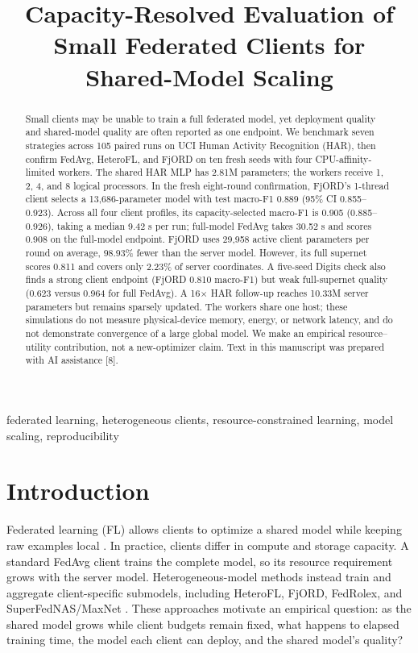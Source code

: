 \documentclass[conference]{IEEEtran}
\title{Capacity-Resolved Evaluation of Small Federated Clients for Shared-Model Scaling}
\author{\IEEEauthorblockN{Anonymous Authors}}
\begin{document}
\maketitle

\begin{abstract}
Small clients may be unable to train a full federated model, yet deployment quality and shared-model quality are often reported as one endpoint. We benchmark seven strategies across 105 paired runs on UCI Human Activity Recognition (HAR), then confirm FedAvg, HeteroFL, and FjORD on ten fresh seeds with four CPU-affinity-limited workers. The shared HAR MLP has 2.81M parameters; the workers receive 1, 2, 4, and 8 logical processors. In the fresh eight-round confirmation, FjORD's 1-thread client selects a 13,686-parameter model with test macro-F1 0.889 (95\% CI 0.855--0.923). Across all four client profiles, its capacity-selected macro-F1 is 0.905 (0.885--0.926), taking a median 9.42 s per run; full-model FedAvg takes 30.52 s and scores 0.908 on the full-model endpoint. FjORD uses 29,958 active client parameters per round on average, 98.93\% fewer than the server model. However, its full supernet scores 0.811 and covers only 2.23\% of server coordinates. A five-seed Digits check also finds a strong client endpoint (FjORD 0.810 macro-F1) but weak full-supernet quality (0.623 versus 0.964 for full FedAvg). A 16$\times$ HAR follow-up reaches 10.33M server parameters but remains sparsely updated. The workers share one host; these simulations do not measure physical-device memory, energy, or network latency, and do not demonstrate convergence of a large global model. We make an empirical resource--utility contribution, not a new-optimizer claim. Text in this manuscript was prepared with AI assistance [8].
\end{abstract}

\begin{IEEEkeywords}
federated learning, heterogeneous clients, resource-constrained learning, model scaling, reproducibility
\end{IEEEkeywords}

\section{Introduction}
Federated learning (FL) allows clients to optimize a shared model while keeping raw examples local \cite{mcmahan}. In practice, clients differ in compute and storage capacity. A standard FedAvg client trains the complete model, so its resource requirement grows with the server model. Heterogeneous-model methods instead train and aggregate client-specific submodels, including HeteroFL, FjORD, FedRolex, and SuperFedNAS/MaxNet \cite{heterofl,fjord,fedrolex,superfednas}. These approaches motivate an empirical question: as the shared model grows while client budgets remain fixed, what happens to elapsed training time, the model each client can deploy, and the shared model's quality?
\end{document}

